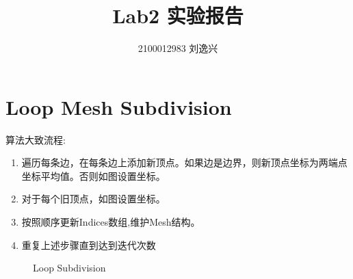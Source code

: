 \documentclass[12pt, a4paper]{ctexart}
\title{Lab2 实验报告}
\author{2100012983 刘逸兴}
\begin{document}
\maketitle
\section{Loop Mesh Subdivision}
算法大致流程:

\begin{enumerate}
    \item 遍历每条边，在每条边上添加新顶点。如果边是边界，则新顶点坐标为两端点坐标平均值。否则如图设置坐标。
    \item 对于每个旧顶点，如图设置坐标。
    \item 按照顺序更新Indices数组,维护Mesh结构。
    \item 重复上述步骤直到达到迭代次数
\end{enumerate}

\begin{figure}[H]
    \centering
    \hspace{0.5in}
    \caption{Loop Subdivision}
\end{figure}
\end{document}
